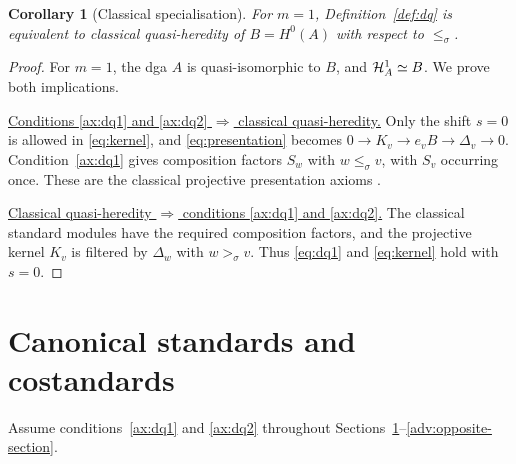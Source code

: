 \documentclass[11pt,a4paper]{article}
\renewcommand{\H}{\mathcal H}
\newcommand{\std}{\Delta}
\let\mod\relax
\DeclareMathOperator{\mod}{mod}
\theoremstyle{plain}
\newtheorem{corollary}[theorem]{Corollary}
\theoremstyle{definition}
\numberwithin{equation}{section}
\begin{document}
\begin{corollary}[Classical specialisation]\label{cor:classical}
For $m=1$, Definition~\ref{def:dq} is equivalent to classical
quasi-heredity of $B=H^0(A)$ with respect to $\leq_\sigma$.
\end{corollary}
\begin{proof}
For $m=1$, the dga $A$ is quasi-isomorphic to $B$, and
$\H_A^1\simeq\mod B$. We prove both implications.

\noindent\underline{Conditions \ref{ax:dq1} and \ref{ax:dq2}
$\Rightarrow$ classical quasi-heredity.}
Only the shift $s=0$ is allowed in \eqref{eq:kernel}, and
\eqref{eq:presentation} becomes
$0\to K_v\to e_vB\to\std_v\to0$.
Condition~\ref{ax:dq1} gives composition factors $S_w$ with
$w\leq_\sigma v$, with $S_v$ occurring once. These are the classical projective
presentation axioms \cite[\S2.1]{BB26}.

\noindent\underline{Classical quasi-heredity $\Rightarrow$
conditions \ref{ax:dq1} and \ref{ax:dq2}.}
The classical standard modules have the required composition factors,
and the projective kernel $K_v$ is filtered by $\std_w$ with
$w>_\sigma v$.
Thus \eqref{eq:dq1} and \eqref{eq:kernel} hold with $s=0$.
\end{proof}

\section{Canonical standards and costandards}\label{adv:canonical-section}

Assume conditions~\ref{ax:dq1} and \ref{ax:dq2} throughout
Sections~\ref{adv:canonical-section}--\ref{adv:opposite-section}.
\end{document}
